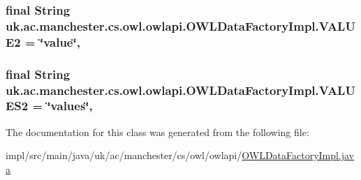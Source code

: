 \hypertarget{classuk_1_1ac_1_1manchester_1_1cs_1_1owl_1_1owlapi_1_1_o_w_l_data_factory_impl_a204be7b0deeeb68aa4c85f6a3b987673}{
\subsubsection[{V\-A\-L\-U\-E2}]{\setlength{\rightskip}{0pt plus 5cm}final String uk.\-ac.\-manchester.\-cs.\-owl.\-owlapi.\-O\-W\-L\-Data\-Factory\-Impl.\-V\-A\-L\-U\-E2 = \char`\"{}value\char`\"{}\hspace{0.3cm}{\ttfamily [static]}, {\ttfamily [private]}}}\label{classuk_1_1ac_1_1manchester_1_1cs_1_1owl_1_1owlapi_1_1_o_w_l_data_factory_impl_a204be7b0deeeb68aa4c85f6a3b987673}
\hypertarget{classuk_1_1ac_1_1manchester_1_1cs_1_1owl_1_1owlapi_1_1_o_w_l_data_factory_impl_af483823c73a9ea314d5f42b837c5e760}{
\subsubsection[{V\-A\-L\-U\-E\-S2}]{\setlength{\rightskip}{0pt plus 5cm}final String uk.\-ac.\-manchester.\-cs.\-owl.\-owlapi.\-O\-W\-L\-Data\-Factory\-Impl.\-V\-A\-L\-U\-E\-S2 = \char`\"{}values\char`\"{}\hspace{0.3cm}{\ttfamily [static]}, {\ttfamily [private]}}}\label{classuk_1_1ac_1_1manchester_1_1cs_1_1owl_1_1owlapi_1_1_o_w_l_data_factory_impl_af483823c73a9ea314d5f42b837c5e760}


The documentation for this class was generated from the following file\-:\begin{DoxyCompactItemize}
\item 
impl/src/main/java/uk/ac/manchester/cs/owl/owlapi/\hyperlink{_o_w_l_data_factory_impl_8java}{O\-W\-L\-Data\-Factory\-Impl.\-java}\end{DoxyCompactItemize}
